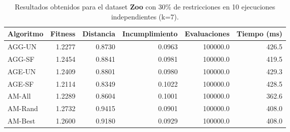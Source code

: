 \begin{table}[H]
    \centering
    \begin{tabular}{lrrrrr}
        \hline
        Algoritmo & Fitness & Distancia & Incumplimiento & Evaluaciones & Tiempo (ms)\\
        \hline
        AGG-UN & 1.2277 & 0.8730 & 0.0963 & 100000.0 & 426.5 \\
        AGG-SF & 1.2454 & 0.8841 & 0.0981 & 100000.0 & 419.5 \\
        AGE-UN & 1.2409 & 0.8801 & 0.0980 & 100000.0 & 429.3 \\
        AGE-SF & 1.2114 & 0.8349 & 0.1022 & 100000.0 & 428.5 \\
        AM-All & 1.2289 & 0.8604 & 0.1001 & 100000.0 & 362.6 \\
        AM-Rand & 1.2732 & 0.9415 & 0.0901 & 100000.0 & 408.0 \\
        AM-Best & 1.2600 & 0.9180 & 0.0929 & 100000.0 & 408.0 \\
        \hline
    \end{tabular}
    \caption{Resultados obtenidos para el dataset \textbf{Zoo} con 30\% de restricciones en  10 ejecuciones independientes (k=7).}
    \label{tab:res_zoo_30}
\end{table}